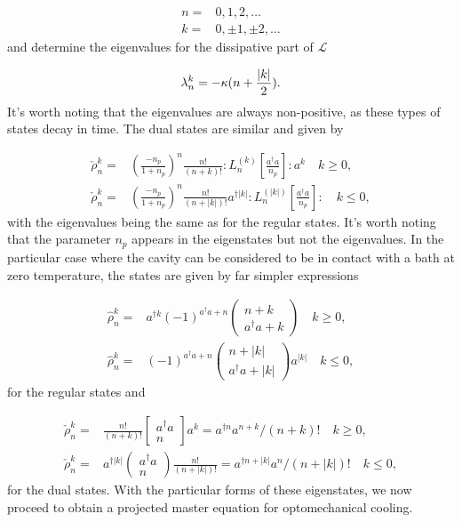 \documentclass[12pt]{article}
\begin{document}
\begin{align}
    n=&0,1,2,\dots \\
    k=&0,\pm 1,\pm 2, \dots
\end{align} and determine the eigenvalues for the dissipative part of $\mathcal{L}$

\begin{equation}
    \lambda_n^k=-\kappa (n+\frac{\abs{k}}{2}).
\end{equation} It's worth noting that the eigenvalues are always non-positive, as these types of states decay in time. The dual states are similar and given by

\begin{align}
    \check{\rho}_n^k=&\left(\frac{-n_p}{1+n_p}\right)^{n} \frac{n !}{(n+k) !}: L_{n}^{(k)}\left[\frac{a^{\dagger} a}{n_p}\right]: a^{k} \quad  k \geq 0, \nonumber \\
   \check{\rho}_n^k=&\left(\frac{-n_p}{1+n_p}\right)^{n} \frac{n !}{(n+|k|) !} a^{\dagger|k|}: L_{n}^{(|k|)}\left[\frac{a^{\dagger} a}{n_p}\right]: \quad k \leq 0, \nonumber
\end{align} with the eigenvalues being the same as for the regular states. It's worth noting that the parameter $n_p$ appears in the eigenstates but not the eigenvalues. In the particular case where the cavity can be considered to be in contact with a bath at zero temperature, the states are given by far simpler expressions

\begin{align}
    \hat{\rho}_n^k=&\nonumber a^{\dagger k}(-1)^{a^{\dagger} a+n}\left(\begin{array}{c}
n+k \\
a^{\dagger} a+k
\end{array}\right) \quad k \geq 0, \\
\hat{\rho}_n^k=& \nonumber (-1)^{a^{\dagger} a+n}\left(\begin{array}{c}
n+|k| \\
a^{\dagger} a+|k|
\end{array}\right) a^{|k|} \quad k \leq 0,
\end{align} for the regular states and 

\begin{align}
    \check{\rho}_n^k =&\nonumber  \frac{n !}{(n+k) !}\left[\begin{array}{c}
a^{\dagger} a \\
n
\end{array}\right] a^{k}=a^{\dagger n} a^{n+k} /(n+k) ! \quad k \geq 0,\\
\check{\rho}_n^k =&\nonumber a^{\dagger|k|}\left(\begin{array}{c}
a^{\dagger} a \\
n
\end{array}\right) \frac{n !}{(n+|k|) !}=a^{\dagger n+|k|} a^{n} /(n+|k|) ! \quad k \leq 0,
\end{align} for the dual states. With the particular forms of these eigenstates, we now proceed to obtain a projected master equation for optomechanical cooling.
\end{document}
